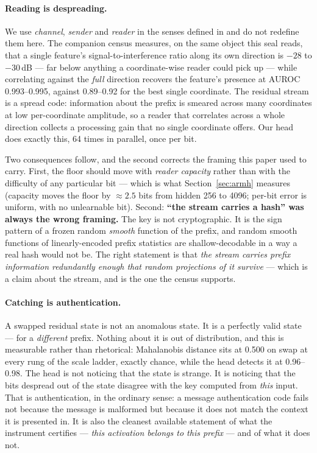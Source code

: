 \documentclass[10pt,twocolumn]{article}
\begin{document}
\paragraph{Reading is despreading.} We use \emph{channel}, \emph{sender} and \emph{reader} in the
senses defined in \citep{paper1} and do not redefine them here. The companion census measures, on
the same object this seal reads, that a single feature's signal-to-interference ratio
along its own direction is $-28$ to $-30$\,dB --- far below anything a coordinate-wise
reader could pick up --- while correlating against the \emph{full} direction recovers
the feature's presence at AUROC 0.993--0.995, against 0.89--0.92 for the best single
coordinate. The residual stream is a spread code: information about the prefix is
smeared across many coordinates at low per-coordinate amplitude, so a reader that
correlates across a whole direction collects a processing gain that no single
coordinate offers. Our head does exactly this, 64 times in parallel, once per bit.

Two consequences follow, and the second corrects the framing this paper used to carry.
First, the floor should move with \emph{reader capacity} rather than with the
difficulty of any particular bit --- which is what Section~\ref{sec:armh} measures
(capacity moves the floor by ${\approx}2.5$ bits from hidden 256 to 4096; per-bit
error is uniform, with no unlearnable bit). Second: \textbf{``the stream carries a
hash'' was always the wrong framing.} The key is not cryptographic. It is the sign
pattern of a frozen random \emph{smooth} function of the prefix, and random smooth
functions of linearly-encoded prefix statistics are shallow-decodable in a way a real
hash would not be. The right statement is that \emph{the stream carries prefix
information redundantly enough that random projections of it survive} --- which is a
claim about the stream, and is the one the census supports.

\paragraph{Catching is authentication.} A swapped residual state is not an anomalous
state. It is a perfectly valid state --- for a \emph{different} prefix. Nothing about
it is out of distribution, and this is measurable rather than rhetorical: Mahalanobis
distance sits at 0.500 on swap at every rung of the scale ladder, exactly chance, while
the head detects it at 0.96--0.98. The head is not noticing that the state is strange.
It is noticing that the bits despread out of the state disagree with the key computed
from \emph{this} input. That is authentication, in the ordinary sense: a message
authentication code fails not because the message is malformed but because it does not
match the context it is presented in. It is also the cleanest available statement of
what the instrument certifies --- \emph{this activation belongs to this prefix} --- and
of what it does not.
\end{document}
